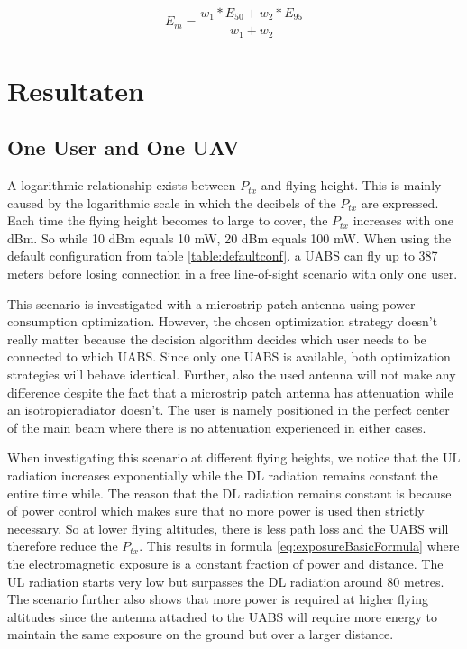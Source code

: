 \documentclass[twocolumn]{phdsymp} %
\begin{document}
\begin{equation} 
E_m = \frac{w_1 * E_{50} + w_2 * E_{95}}{w_1 + w_2}
\label{eq:em}
\end{equation}




\section{Resultaten}
\subsection{One User and One \gls{UAV}}

A logarithmic relationship exists between $P_{tx}$ and flying height. This is mainly caused by the logarithmic 
scale in which the decibels of the $P_{tx}$ are expressed. Each time the flying height becomes to large to cover, the 
$P_{tx}$ increases with one dBm. So while 10 dBm equals 10 mW, 20 dBm equals 100 mW. 
When using the default configuration from table \ref{table:defaultconf}. 
a \gls{UABS} can fly up to 387 meters before losing connection in a free line-of-sight scenario with only one user.

This scenario is investigated with a microstrip patch antenna using power consumption optimization. 
 However, the chosen optimization strategy doesn't really matter because the decision 
 algorithm decides which user 
needs to be connected to which \gls{UABS}. Since only one \gls{UABS} is available, both optimization strategies will behave identical.
Further, also the used antenna will not make any difference
despite the fact that a microstrip patch antenna has attenuation while an \gls{isotropicradiator} doesn't.
The user is namely positioned in the perfect center of the main beam where there is 
no attenuation experienced in either cases.

When investigating this scenario at different flying heights, we notice 
that the \gls{UL} radiation 
increases exponentially while 
the \gls{DL} radiation remains constant the entire time while. The reason that the \gls{DL} radiation
remains constant is because of power control which makes sure that no more power is used then strictly necessary. 
So at lower flying altitudes, there is less path loss and the \gls{UABS} 
will therefore reduce the $P_{tx}$. This results in formula \ref{eq:exposureBasicFormula} where the electromagnetic exposure is a constant fraction of power and distance.
The \gls{UL} radiation starts very low but surpasses the \gls{DL} radiation 
around 80 metres. The scenario further also shows that more power is required at higher flying altitudes since the antenna 
attached to the \gls{UABS} will require more energy to maintain the same exposure on the ground but over a larger distance.
\end{document}
